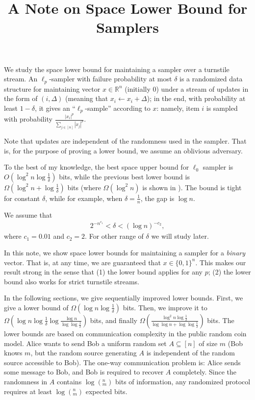 \documentclass[10pt]{article}
\title{A Note on Space Lower Bound for Samplers}
\begin{document}
	
\maketitle

We study the space lower bound for maintaining a sampler over a turnstile stream. An $\ell_p$-sampler with failure probability at most $\delta$ is a randomized data structure for maintaining vector $x\in \mathbb{R}^n$ (initially 0) under a stream of updates in the form of $(i, \Delta)$ (meaning that $x_i \leftarrow x_i+\Delta$); in the end, with probability at least $1-\delta$, it gives an ``$\ell_p$-sample'' according to $x$: namely, item $i$ is sampled with probability $\frac{|x_i|^p}{\sum_{j\in [n]}{|x_j|^p}}$. 

Note that updates are independent of the randomness used in the sampler. That is, for the purpose of proving a lower bound, we assume an oblivious adversary. 

To the best of my knowledge, the best space upper bound for $\ell_0$ sampler is $O(\log^2 n \log \frac{1}{\delta})$ bits, while the previous best lower bound is $\Omega(\log^2 n +\log\frac{1}{\delta})$ bits (where $\Omega(\log^2 n)$ is shown in \cite{jowhari2011tight}). The bound is tight for constant $\delta$, while for example, when $\delta=\frac{1}{n}$, the gap is $\log n$. 

We assume that 
\begin{align} \label{formula:delta-range}
2^{-n^{c_1}}<\delta<(\log n)^{-c_2},
\end{align}
where $c_1=0.01$ and $c_2=2$. For other range of $\delta$ we will study later.

In this note, we show space lower bounds for maintaining a sampler for a {\em binary} vector. That is, at any time, we are guaranteed that $x\in \{0,1\}^n$. This makes our result strong in the sense that (1) the lower bound applies for any $p$; (2) the lower bound also works for strict turnstile streams.

In the following sections, we give sequentially improved lower bounds. First, we give a lower bound of $\Omega(\log n \log \frac{1}{\delta})$ bits. Then, we improve it to $\Omega(\log n \log {\frac{1}{\delta}} \log \frac{\log n}{\log\log \frac{1}{\delta}})$ bits, and finally $\Omega(\frac{\log^2 n \log \frac{1}{\delta}}{\log\log n + \log\log \frac{1}{\delta}})$ bits. The lower bounds are based on communication complexity in the public random coin model. Alice wants to send Bob a uniform random set $A\subseteq [n]$ of size $m$ (Bob knows $m$, but the random source generating $A$ is independent of the random source accessible to Bob). The one-way communication problem is: Alice sends some message to Bob, and Bob is required to recover $A$ completely. Since the randomness in $A$ contains $\log (^n_m)$ bits of information, any randomized protocol requires at least $\log (^n_m)$ expected bits. 
\end{document}
